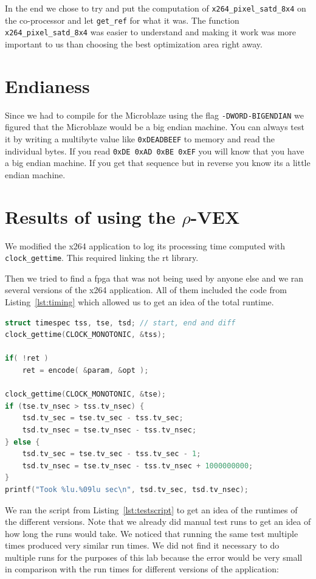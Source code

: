 \documentclass{article}
\newcommand{\rvex}{\ensuremath{\rho}-VEX}
\newcommand{\satd}{\texttt{x264\_pixel\_satd\_8x4}}
\newcommand{\getref}{\texttt{get\_ref}}
\begin{document}
In the end we chose to try and put the computation of \satd{} on the
co-processor and let \getref{} for what it was.  The function \satd{} was
easier to understand and making it work was more important to us than choosing
the best optimization area right away.

\section{Endianess}

Since we had to compile for the Microblaze using the flag
\texttt{-DWORD-BIGENDIAN} we figured that the Microblaze would be a big endian
machine.  You can always test it by writing a multibyte value like
\texttt{0xDEADBEEF} to memory and read the individual bytes. If you read
\texttt{0xDE 0xAD 0xBE 0xEF} you will know that you have a big endian machine.
If you get that sequence but in reverse you know its a little endian machine.

\section{Results of using the \rvex{}}

We modified the x264 application to log its processing time computed with
\texttt{clock\_gettime}. This required linking the rt library.

Then we tried to find a fpga that was not being used by anyone else and we ran
several versions of the x264 application.  All of them included the code from
Listing~\ref{lst:timing} which allowed us to get an idea of the total runtime.

\begin{lstlisting}[language=C,style=C,caption=Capturing runtime with the monotonic clock,label=lst:timing]
struct timespec tss, tse, tsd; // start, end and diff
clock_gettime(CLOCK_MONOTONIC, &tss);

if( !ret )
    ret = encode( &param, &opt );

clock_gettime(CLOCK_MONOTONIC, &tse);
if (tse.tv_nsec > tss.tv_nsec) {
    tsd.tv_sec = tse.tv_sec - tss.tv_sec;
    tsd.tv_nsec = tse.tv_nsec - tss.tv_nsec;
} else {
    tsd.tv_sec = tse.tv_sec - tss.tv_sec - 1;
    tsd.tv_nsec = tse.tv_nsec - tss.tv_nsec + 1000000000;
}
printf("Took %lu.%09lu sec\n", tsd.tv_sec, tsd.tv_nsec);
\end{lstlisting}

We ran the script from Listing~\ref{lst:testscript} to get an idea of the
runtimes of the different versions.  Note that we already did manual test runs
to get an idea of how long the runs would take.  We noticed that running the
same test multiple times produced very similar run times.  We did not find it
necessary to do multiple runs for the purposes of this lab because the error
would be very small in comparison with the run times for different versions of
the application:
\end{document}
